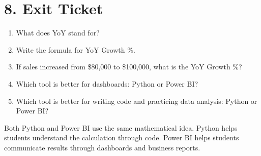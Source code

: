 \documentclass[11pt]{article}
\begin{document}
\section{8. Exit Ticket}
\begin{enumerate}[itemsep=4pt]
    \item What does YoY stand for?
    \item Write the formula for YoY Growth \%.
    \item If sales increased from \$80,000 to \$100,000, what is the YoY Growth \%?
    \item Which tool is better for dashboards: Python or Power BI?
    \item Which tool is better for writing code and practicing data analysis: Python or Power BI?
\end{enumerate}

\begin{tcolorbox}[colback=LightBlue,colframe=DeepNavy,title=Teacher Note]
Both Python and Power BI use the same mathematical idea. Python helps students understand the calculation through code. Power BI helps students communicate results through dashboards and business reports.
\end{tcolorbox}
\end{document}
